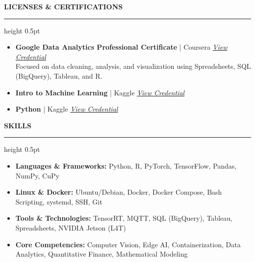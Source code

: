 \documentclass[11pt, letterpaper]{article}
\newcommand{\cvsection}[1]{%
    \vspace{0.8em}%
    {\large \textbf{\MakeUppercase{#1}}}%
    \vspace{0.2em}%
    \hrule height 0.5pt%
    \vspace{0.4em}%
}
\begin{document}
\cvsection{Licenses \& Certifications}
\begin{itemize}[leftmargin=*, nosep]
    \item \textbf{Google Data Analytics Professional Certificate} | Coursera \hfill
        \href{https://www.coursera.org/account/accomplishments/professional-cert/certificate/V0X92BL0CM9Y}{\textit{View Credential}} \\
        Focused on data cleaning, analysis, and visualization using Spreadsheets, SQL (BigQuery), Tableau, and R.
    \item \textbf{Intro to Machine Learning} | Kaggle \hfill
        \href{https://www.kaggle.com/learn/certification/edricoseptianelyazar/intro-to-machine-learning}{\textit{View Credential}}
    \item \textbf{Python} | Kaggle \hfill
        \href{https://www.kaggle.com/learn/certification/edricoseptianelyazar/python}{\textit{View Credential}}
\end{itemize}

\cvsection{Skills}
\begin{itemize}[leftmargin=*, nosep]
    \item \textbf{Languages \& Frameworks:} Python, R, PyTorch, TensorFlow, Pandas, NumPy, CuPy
    \item \textbf{Linux \& Docker:} Ubuntu/Debian, Docker, Docker Compose, Bash Scripting, systemd, SSH, Git
    \item \textbf{Tools \& Technologies:} TensorRT, MQTT, SQL (BigQuery), Tableau, Spreadsheets, NVIDIA Jetson (L4T)
    \item \textbf{Core Competencies:} Computer Vision, Edge AI, Containerization, Data Analytics, Quantitative Finance, Mathematical Modeling
\end{itemize}
\end{document}
